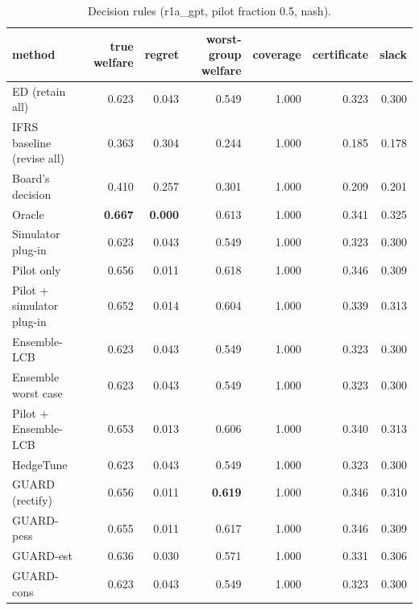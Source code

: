 \begin{table}[t]
\centering
\small
\begin{tabular}{lrrrrrr}
\toprule
method & true welfare & regret & worst-group welfare & coverage & certificate & slack \\
\midrule
ED (retain all) & 0.623 & 0.043 & 0.549 & 1.000 & 0.323 & 0.300 \\
IFRS baseline (revise all) & 0.363 & 0.304 & 0.244 & 1.000 & 0.185 & 0.178 \\
Board's decision & 0.410 & 0.257 & 0.301 & 1.000 & 0.209 & 0.201 \\
Oracle & \textbf{0.667} & \textbf{0.000} & 0.613 & 1.000 & 0.341 & 0.325 \\
Simulator plug-in & 0.623 & 0.043 & 0.549 & 1.000 & 0.323 & 0.300 \\
Pilot only & 0.656 & 0.011 & 0.618 & 1.000 & 0.346 & 0.309 \\
Pilot + simulator plug-in & 0.652 & 0.014 & 0.604 & 1.000 & 0.339 & 0.313 \\
Ensemble-LCB & 0.623 & 0.043 & 0.549 & 1.000 & 0.323 & 0.300 \\
Ensemble worst case & 0.623 & 0.043 & 0.549 & 1.000 & 0.323 & 0.300 \\
Pilot + Ensemble-LCB & 0.653 & 0.013 & 0.606 & 1.000 & 0.340 & 0.313 \\
HedgeTune & 0.623 & 0.043 & 0.549 & 1.000 & 0.323 & 0.300 \\
GUARD (rectify) & 0.656 & 0.011 & \textbf{0.619} & 1.000 & 0.346 & 0.310 \\
GUARD-pess & 0.655 & 0.011 & 0.617 & 1.000 & 0.346 & 0.309 \\
GUARD-est & 0.636 & 0.030 & 0.571 & 1.000 & 0.331 & 0.306 \\
GUARD-cons & 0.623 & 0.043 & 0.549 & 1.000 & 0.323 & 0.300 \\
\bottomrule
\end{tabular}
\caption{Decision rules (r1a\_gpt, pilot fraction 0.5, nash).}
\label{tab:methods-nash}
\end{table}
